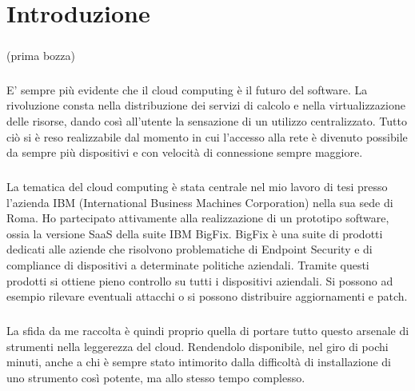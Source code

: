 \chapter{Introduzione}

\paragraph{}
(prima bozza)

\paragraph{}
E' sempre più evidente che il cloud computing è il futuro del software. La rivoluzione consta nella distribuzione dei servizi di calcolo e nella virtualizzazione delle risorse, dando così all'utente la sensazione di un utilizzo centralizzato. Tutto ciò si è reso realizzabile dal momento in cui l'accesso alla rete è divenuto possibile da sempre più dispositivi e con velocità di connessione sempre maggiore.
\paragraph{}
La tematica del cloud computing è stata centrale nel mio lavoro di tesi presso l'azienda IBM (International Business Machines Corporation) nella sua sede di Roma. Ho partecipato attivamente alla realizzazione di un prototipo software, ossia la versione SaaS della suite IBM BigFix. BigFix è una suite di prodotti dedicati alle aziende che risolvono problematiche di Endpoint Security e di compliance di dispositivi a determinate politiche aziendali. Tramite questi prodotti si ottiene pieno controllo su tutti i dispositivi aziendali. Si possono ad esempio rilevare eventuali attacchi o si possono distribuire aggiornamenti e patch.
\paragraph{}
La sfida da me raccolta è quindi proprio quella di portare tutto questo arsenale di strumenti nella leggerezza del cloud. Rendendolo disponibile, nel giro di pochi minuti, anche a chi è sempre stato intimorito dalla difficoltà di installazione di uno strumento così potente, ma allo stesso tempo complesso.